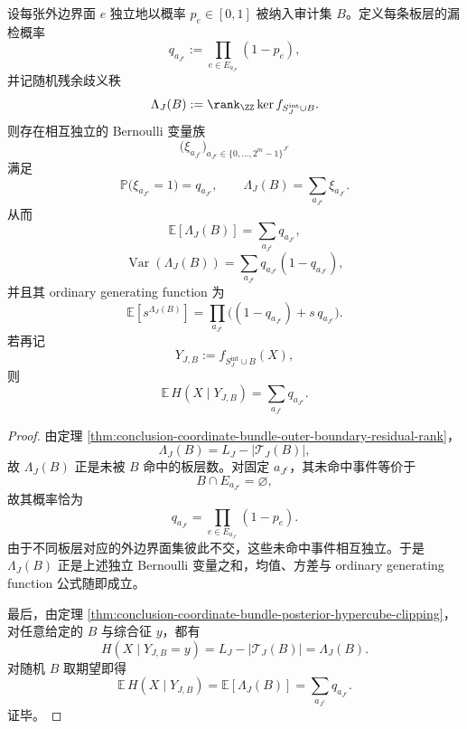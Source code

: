 \begin{theorem}\label{thm:conclusion-coordinate-bundle-random-audit-poisson-binomial}
设每张外边界面 \(e\) 独立地以概率 \(p_e\in[0,1]\) 被纳入审计集 \(B\)。定义每条板层的漏检概率
\[
q_{a_{J^c}}
:=
\prod_{e\in E_{a_{J^c}}}(1-p_e),
\]
并记随机残余歧义秩
\[
\Lambda_J(B)
:=
\rank_{\ZZ}\ker f_{S_J^{\mathrm{int}}\cup B}.
\]
则存在相互独立的 Bernoulli 变量族
\[
\bigl(\xi_{a_{J^c}}\bigr)_{a_{J^c}\in\{0,\dots,2^m-1\}^{J^c}}
\]
满足
\[
\mathbb P\bigl(\xi_{a_{J^c}}=1\bigr)=q_{a_{J^c}},
\qquad
\Lambda_J(B)=\sum_{a_{J^c}}\xi_{a_{J^c}}.
\]
从而
\[
\mathbb E[\Lambda_J(B)]
=
\sum_{a_{J^c}}q_{a_{J^c}},
\]
\[
\operatorname{Var}(\Lambda_J(B))
=
\sum_{a_{J^c}}q_{a_{J^c}}(1-q_{a_{J^c}}),
\]
并且其 ordinary generating function 为
\[
\mathbb E[s^{\Lambda_J(B)}]
=
\prod_{a_{J^c}}
\bigl((1-q_{a_{J^c}})+s\,q_{a_{J^c}}\bigr).
\]
若再记
\[
Y_{J,B}:=f_{S_J^{\mathrm{int}}\cup B}(X),
\]
则
\[
\mathbb E\,H(X\mid Y_{J,B})
=
\sum_{a_{J^c}}q_{a_{J^c}}.
\]
\end{theorem}
\begin{proof}
由定理 \ref{thm:conclusion-coordinate-bundle-outer-boundary-residual-rank}，
\[
\Lambda_J(B)
=
L_J-|\mathcal T_J(B)|,
\]
故 \(\Lambda_J(B)\) 正是未被 \(B\) 命中的板层数。对固定 \(a_{J^c}\)，其未命中事件等价于
\[
B\cap E_{a_{J^c}}=\varnothing,
\]
故其概率恰为
\[
q_{a_{J^c}}
=
\prod_{e\in E_{a_{J^c}}}(1-p_e).
\]
由于不同板层对应的外边界面集彼此不交，这些未命中事件相互独立。于是 \(\Lambda_J(B)\) 正是上述独立 Bernoulli 变量之和，均值、方差与 ordinary generating function 公式随即成立。

最后，由定理 \ref{thm:conclusion-coordinate-bundle-posterior-hypercube-clipping}，对任意给定的 \(B\) 与综合征 \(y\)，都有
\[
H(X\mid Y_{J,B}=y)=L_J-|\mathcal T_J(B)|=\Lambda_J(B).
\]
对随机 \(B\) 取期望即得
\[
\mathbb E\,H(X\mid Y_{J,B})=\mathbb E[\Lambda_J(B)]=\sum_{a_{J^c}}q_{a_{J^c}}.
\]
证毕。
\end{proof}

